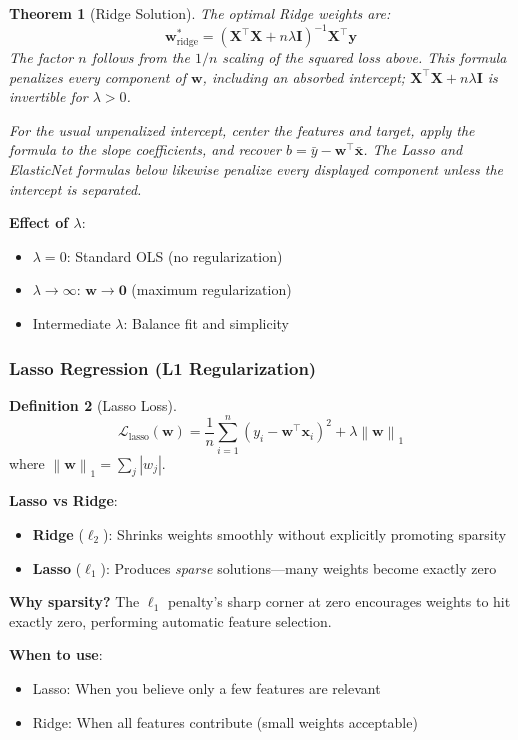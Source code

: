 \documentclass[11pt,twoside]{article}
\numberwithin{equation}{section}
\newcommand{\vect}[1]{\bm{#1}}
\newcommand{\mat}[1]{\bm{#1}}
\newcommand{\norm}[1]{\left\lVert#1\right\rVert}
\newcommand{\Loss}{\mathcal{L}}
\theoremstyle{plain}
\newtheorem{theorem}{Theorem}[section]
\theoremstyle{definition}
\newtheorem{definition}[theorem]{Definition}
\theoremstyle{remark}
\newenvironment{keyidea}{
  \begin{tcolorbox}[colback=yellow!5!white,
                    colframe=yellow!50!black,
                    title=Key Idea,
                    breakable,
                    enhanced,
                    sharp corners,
                    boxrule=0.8pt,
                    left=6pt, right=6pt, top=6pt, bottom=6pt]
}{
  \end{tcolorbox}
}
\begin{document}
\begin{theorem}[Ridge Solution]
The optimal Ridge weights are:
\[
\vect{w}^*_{\text{ridge}} = (\mat{X}^\top\mat{X} + n\lambda \mat{I})^{-1}\mat{X}^\top\vect{y}
\]
The factor $n$ follows from the $1/n$ scaling of the squared loss above. This formula penalizes every component of $\vect{w}$, including an absorbed intercept; $\mat{X}^\top\mat{X}+n\lambda\mat{I}$ is invertible for $\lambda>0$.

For the usual unpenalized intercept, center the features and target, apply the formula to the slope coefficients, and recover $b=\bar y-\vect{w}^\top\bar{\vect{x}}$. The Lasso and ElasticNet formulas below likewise penalize every displayed component unless the intercept is separated.
\end{theorem}

\textbf{Effect of $\lambda$}:
\begin{itemize}
\item $\lambda = 0$: Standard OLS (no regularization)
\item $\lambda \to \infty$: $\vect{w} \to \vect{0}$ (maximum regularization)
\item Intermediate $\lambda$: Balance fit and simplicity
\end{itemize}

\subsubsection{Lasso Regression (L1 Regularization)}

\begin{definition}[Lasso Loss]
\[
\Loss_{\text{lasso}}(\vect{w}) = \frac{1}{n}\sum_{i=1}^n (y_i - \vect{w}^\top\vect{x}_i)^2 + \lambda \norm{\vect{w}}_1
\]
where $\norm{\vect{w}}_1 = \sum_j |w_j|$.
\end{definition}

\begin{keyidea}
\textbf{Lasso vs Ridge}:
\begin{itemize}
\item \textbf{Ridge} ($\ell_2$): Shrinks weights smoothly without explicitly promoting sparsity
\item \textbf{Lasso} ($\ell_1$): Produces \emph{sparse} solutions---many weights become exactly zero
\end{itemize}

\textbf{Why sparsity?} The $\ell_1$ penalty's sharp corner at zero encourages weights to hit exactly zero, performing automatic feature selection.

\textbf{When to use}:
\begin{itemize}
\item Lasso: When you believe only a few features are relevant
\item Ridge: When all features contribute (small weights acceptable)
\end{itemize}
\end{keyidea}
\end{document}
